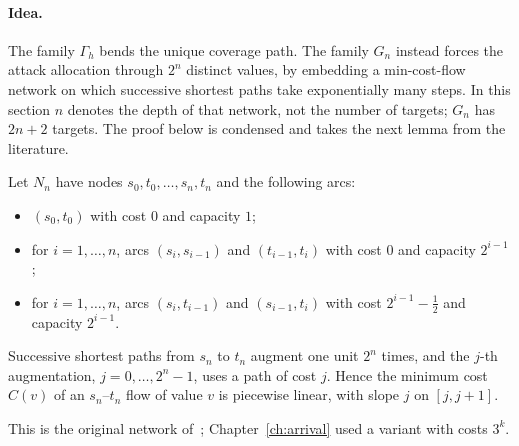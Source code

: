 \paragraph{Idea.} The family $\Gamma_h$ bends the unique coverage path. The family $G_n$ instead forces
the attack allocation through $2^n$ distinct values, by embedding a min-cost-flow network on which
successive shortest paths take exponentially many steps. In this section $n$ denotes the depth of that
network, not the number of targets; $G_n$ has $2n+2$ targets. The proof below is condensed and takes the
next lemma from the literature.

\begin{lemma}\label{artlck:lem:ds}
\statuscited
Let $N_n$ have nodes $s_0,t_0,\dots,s_n,t_n$ and the following arcs:
\begin{itemize}[nosep]
\item $(s_0,t_0)$ with cost $0$ and capacity $1$;
\item for $i=1,\dots,n$, arcs $(s_i,s_{i-1})$ and $(t_{i-1},t_i)$ with cost $0$ and capacity $2^{i-1}$;
\item for $i=1,\dots,n$, arcs $(s_i,t_{i-1})$ and $(s_{i-1},t_i)$ with cost $2^{i-1}-\frac12$ and capacity
$2^{i-1}$.
\end{itemize}
Successive shortest paths from $s_n$ to $t_n$ augment one unit $2^n$ times, and the $j$-th augmentation,
$j=0,\dots,2^n-1$, uses a path of cost $j$. Hence the minimum cost $C(v)$ of an $s_n$--$t_n$ flow of value
$v$ is piecewise linear, with slope $j$ on $[j,j+1]$.
\end{lemma}

This is the original network of~\cite{ds15}; Chapter~\ref{ch:arrival} used a variant with costs $3^k$.

